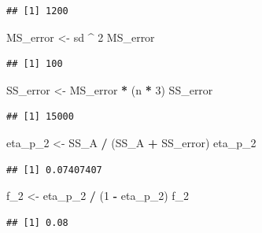 \documentclass[]{book}
\newenvironment{Shaded}{\begin{snugshade}}{\end{snugshade}}
\newcommand{\DecValTok}[1]{\textcolor[rgb]{0.00,0.00,0.81}{#1}}
\newcommand{\NormalTok}[1]{#1}
\newcommand{\OperatorTok}[1]{\textcolor[rgb]{0.81,0.36,0.00}{\textbf{#1}}}
\newcommand{\StringTok}[1]{\textcolor[rgb]{0.31,0.60,0.02}{#1}}
\begin{document}
\begin{verbatim}
## [1] 1200
\end{verbatim}

\begin{Shaded}
\begin{Highlighting}[]
\NormalTok{MS_error <-}\StringTok{ }\NormalTok{sd }\OperatorTok{^}\StringTok{ }\DecValTok{2}
\NormalTok{MS_error}
\end{Highlighting}
\end{Shaded}

\begin{verbatim}
## [1] 100
\end{verbatim}

\begin{Shaded}
\begin{Highlighting}[]
\NormalTok{SS_error <-}\StringTok{ }\NormalTok{MS_error }\OperatorTok{*}\StringTok{ }\NormalTok{(n }\OperatorTok{*}\StringTok{ }\DecValTok{3}\NormalTok{)}
\NormalTok{SS_error}
\end{Highlighting}
\end{Shaded}

\begin{verbatim}
## [1] 15000
\end{verbatim}

\begin{Shaded}
\begin{Highlighting}[]
\NormalTok{eta_p_}\DecValTok{2}\NormalTok{ <-}\StringTok{ }\NormalTok{SS_A }\OperatorTok{/}\StringTok{ }\NormalTok{(SS_A }\OperatorTok{+}\StringTok{ }\NormalTok{SS_error)}
\NormalTok{eta_p_}\DecValTok{2}
\end{Highlighting}
\end{Shaded}

\begin{verbatim}
## [1] 0.07407407
\end{verbatim}

\begin{Shaded}
\begin{Highlighting}[]
\NormalTok{f_}\DecValTok{2}\NormalTok{ <-}\StringTok{ }\NormalTok{eta_p_}\DecValTok{2} \OperatorTok{/}\StringTok{ }\NormalTok{(}\DecValTok{1} \OperatorTok{-}\StringTok{ }\NormalTok{eta_p_}\DecValTok{2}\NormalTok{)}
\NormalTok{f_}\DecValTok{2}
\end{Highlighting}
\end{Shaded}

\begin{verbatim}
## [1] 0.08
\end{verbatim}
\end{document}
